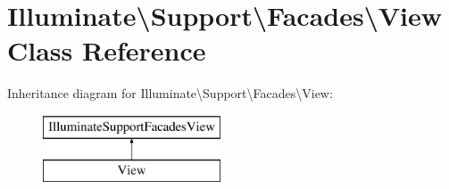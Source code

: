 \hypertarget{class_illuminate_1_1_support_1_1_facades_1_1_view}{}\section{Illuminate\textbackslash{}Support\textbackslash{}Facades\textbackslash{}View Class Reference}
\label{class_illuminate_1_1_support_1_1_facades_1_1_view}
Inheritance diagram for Illuminate\textbackslash{}Support\textbackslash{}Facades\textbackslash{}View\+:\begin{figure}[H]
\begin{center}
\leavevmode
\includegraphics[height=2.000000cm]{class_illuminate_1_1_support_1_1_facades_1_1_view}
\end{center}
\end{figure}
